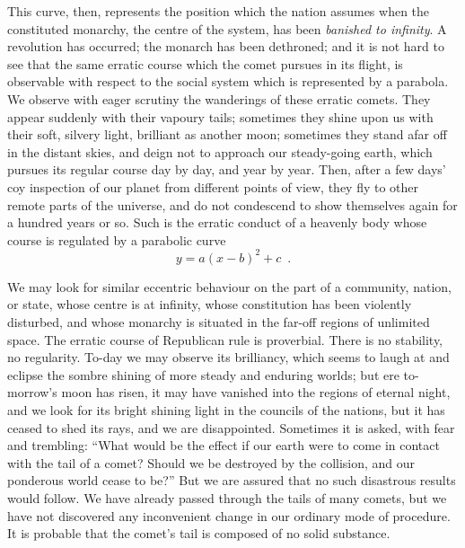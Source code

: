 \documentclass[draft]{jocg}
\theoremstyle{plain}
\theoremstyle{definition}
\begin{document}
This curve, then, represents the position which the nation assumes
when the constituted monarchy, the centre of the system, has been
\emph{banished to infinity}. A revolution has occurred; the monarch has
been dethroned; and it is not hard to see that the same erratic course
which the comet pursues in its flight, is observable with respect to the
social system which is represented by a parabola. We observe with eager
scrutiny the wanderings of these erratic comets. They appear suddenly
with their vapoury tails; sometimes they shine upon us with their soft,
silvery light, brilliant as another moon; sometimes they stand afar off
in the distant skies, and deign not to approach our steady-going earth,
which pursues its regular course day by day, and year by year. Then, after
a few days’ coy inspection of our planet from different points of view,
they fly to other remote parts of the universe, and do not condescend
to show themselves again for a  hundred years or so. Such is the erratic
conduct of a heavenly body whose course is regulated by a parabolic curve
\[
     y = a(x-b)^2 + c \enspace .
\]

We may look for similar eccentric behaviour on the part of a community,
nation, or state, whose centre is at infinity, whose constitution has
been violently disturbed, and whose monarchy is situated in the far-off
regions of unlimited space. The erratic course of Republican rule is
proverbial. There is no stability, no regularity. To-day we may observe
its brilliancy, which seems to laugh at and eclipse the sombre shining of
more steady and enduring worlds; but ere to-morrow's moon has risen,
it may have vanished into the regions of eternal night, and we look
for its bright shining light in the councils of the nations, but it has
ceased to shed its rays, and we are disappointed. Sometimes it is asked,
with fear and trembling: ``What would be the effect if our earth were
to come in contact with the tail of a comet? Should we be destroyed
by the collision, and our ponderous world cease to be?'' But we are
assured that no such disastrous results would follow. We have already
passed through the tails of many comets, but we have not discovered any
inconvenient change in our ordinary mode of procedure. It is probable
that the comet's tail is composed of no solid substance.
\end{document}
